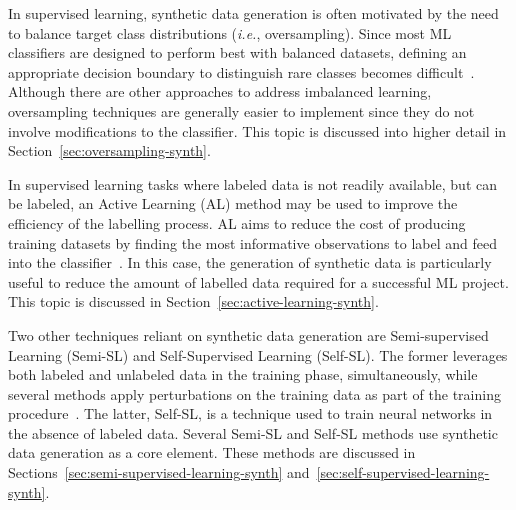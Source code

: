 In supervised learning, synthetic data generation is often motivated by the
need to balance target class distributions (\textit{i.e.}, oversampling).
Since most ML classifiers are designed to perform best with balanced datasets,
defining an appropriate decision boundary to distinguish rare classes becomes
difficult~\cite{saez2016analyzing}. Although there are other approaches to
address imbalanced learning, oversampling techniques are generally easier to
implement since they do not involve modifications to the classifier. This
topic is discussed into higher detail in Section~\ref{sec:oversampling-synth}.

In supervised learning tasks where labeled data is not readily available, but
can be labeled, an Active Learning (AL) method may be used to improve the
efficiency of the labelling process. AL aims to reduce the cost of producing
training datasets by finding the most informative observations to label and
feed into the classifier~\cite{Fonseca2021al}. In this case, the
generation of synthetic data is particularly useful to reduce the amount of
labelled data required for a successful ML project. This topic is discussed in
Section~\ref{sec:active-learning-synth}.

Two other techniques reliant on synthetic data generation are Semi-supervised
Learning (Semi-SL) and Self-Supervised Learning (Self-SL). The former
leverages both labeled and unlabeled data in the training phase,
simultaneously, while several methods apply perturbations on the training data
as part of the training procedure~\cite{Van2020}. The latter, Self-SL,
is a technique used to train neural networks in the absence of labeled data.
Several Semi-SL and Self-SL methods use synthetic data generation as a core
element. These methods are discussed in
Sections~\ref{sec:semi-supervised-learning-synth}
and~\ref{sec:self-supervised-learning-synth}.



 
 
